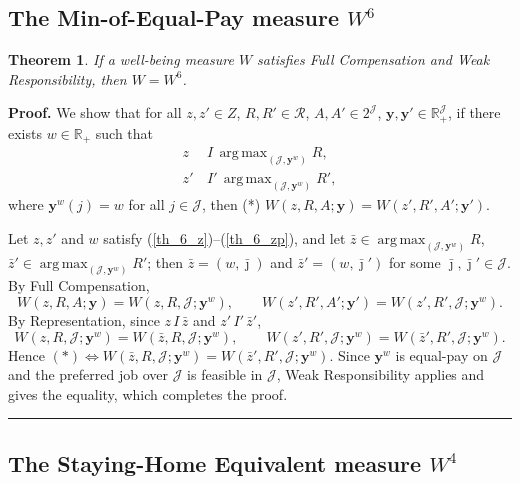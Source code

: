 \documentclass[12pt,thmsb]{article}
\DeclareMathOperator*{\argmax}{arg\,max}
\newtheorem{theorem}{Theorem}
\newenvironment{proof}[1][Proof]{\noindent \textbf{#1.} }{\  \rule{0.5em}{0.5em}}
\begin{document}
\subsection{The Min-of-Equal-Pay measure $W^6$}

\begin{theorem}
\label{thm:w6}
If a well-being measure $W$ satisfies Full Compensation and Weak
Responsibility, then $W=W^6$.
\end{theorem}

\begin{proof}
We show that for all $z,z'\in Z$, $R,R'\in\mathcal R$, $A,A'\in 2^{\mathcal J}$,
$\mathbf y,\mathbf y'\in\mathbb R_+^{\mathcal J}$, if there exists
$w\in\mathbb R_+$ such that
\begin{align}
z\,&I\,\argmax_{(\mathcal J,\mathbf y^w)}R, \label{th_6_z}\\
z'\,&I'\,\argmax_{(\mathcal J,\mathbf y^w)}R', \label{th_6_zp}
\end{align}
where $\mathbf y^w(j)=w$ for all $j\in\mathcal J$, then (*)
$W(z,R,A;\mathbf y)=W(z',R',A';\mathbf y')$.

Let $z,z'$ and $w$ satisfy (\ref{th_6_z})--(\ref{th_6_zp}), and let
$\bar z\in\argmax_{(\mathcal J,\mathbf y^w)}R$,
$\bar z'\in\argmax_{(\mathcal J,\mathbf y^w)}R'$; then $\bar z=(w,\bar\jmath)$ and
$\bar z'=(w,\bar\jmath')$ for some $\bar\jmath,\bar\jmath'\in\mathcal J$. By Full
Compensation,
\begin{equation*}
W(z,R,A;\mathbf y)=W(z,R,\mathcal J;\mathbf y^w),\qquad
W(z',R',A';\mathbf y')=W(z',R',\mathcal J;\mathbf y^w).
\end{equation*}
By Representation, since $z\,I\,\bar z$ and $z'\,I'\,\bar z'$,
\begin{equation*}
W(z,R,\mathcal J;\mathbf y^w)=W(\bar z,R,\mathcal J;\mathbf y^w),\qquad
W(z',R',\mathcal J;\mathbf y^w)=W(\bar z',R',\mathcal J;\mathbf y^w).
\end{equation*}
Hence $(*)\Leftrightarrow W(\bar z,R,\mathcal J;\mathbf y^w)=W(\bar
z',R',\mathcal J;\mathbf y^w)$. Since $\mathbf y^w$ is equal-pay on
$\mathcal J$ and the preferred job over $\mathcal J$ is feasible in
$\mathcal J$, Weak Responsibility applies and gives the equality, which
completes the proof.
\end{proof}

\subsection{The Staying-Home Equivalent measure $W^4$}
\end{document}
